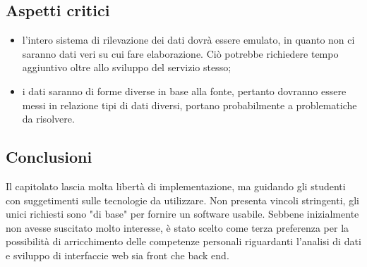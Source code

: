 \subsection{Aspetti critici}
\begin{itemize}
    \item l'intero sistema di rilevazione dei dati dovrà essere emulato, in quanto non ci saranno dati veri su cui fare elaborazione. Ciò potrebbe richiedere tempo aggiuntivo oltre allo sviluppo del servizio stesso;
    \item i dati saranno di forme diverse in base alla fonte, pertanto dovranno essere messi in relazione tipi di dati diversi, portano probabilmente a problematiche da risolvere.
\end{itemize}
\subsection{Conclusioni}
Il capitolato lascia molta libertà di implementazione, ma guidando gli studenti con suggetimenti sulle tecnologie da utilizzare.
Non presenta vincoli stringenti, gli unici richiesti sono "di base" per fornire un software usabile.
Sebbene inizialmente non avesse suscitato molto interesse, è stato scelto come terza preferenza per la possibilità di arricchimento delle competenze personali
riguardanti l'analisi di dati e sviluppo di interfaccie web sia front che back end.
